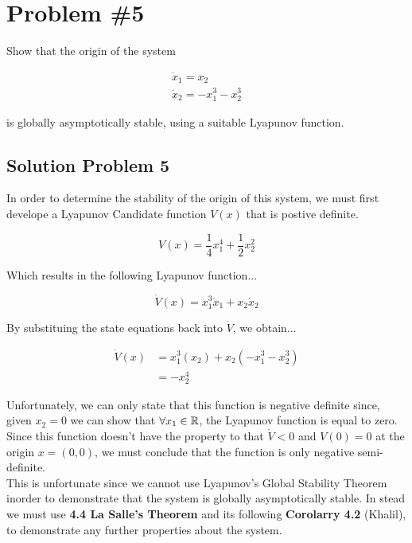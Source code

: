 \section*{Problem \#5}

Show that the origin of the system

$$
\begin{array}{l}
\dot{x}_{1}=x_{2} \\
\dot{x}_{2}=-x_{1}^{3}-x_{2}^{3}
\end{array}
$$

\noindent is globally asymptotically stable, using a suitable Lyapunov function.


\subsection*{Solution Problem 5}

In order to determine the stability of the origin of this system, we must first develope a Lyapunov Candidate function $V(x)$ that is postive definite.

$$
V(x) = \frac{1}{4}x_1^4 + \frac{1}{2}x_2^2
$$

\noindent Which results in the following Lyapunov function...

$$
\dot{V}(x) = x_1^3\dot{x}_1 + x_2\dot{x}_2
$$

\noindent By substituing the state equations back into $\dot{V}$, we obtain...

$$
\begin{aligned}
  \dot{V}(x) & = x_1^3(x_2) + x_2 (-x_1^3 -x_2^3) \\
        & = -x_2^4
\end{aligned}
$$

\noindent Unfortunately, we can only state that this function is negative definite since, given $x_2 =0$ we can show that $\forall x_1 \in \mathbb{R}$, the Lyapunov function is equal to zero. Since this function doesn't have the property to that $\dot{V}< 0$ and $V(0)=0$ at the origin $x = (0,0)$, we must conclude that the function is only negative semi-definite. \\

\noindent This is unfortunate since we cannot use Lyapunov's Global Stability Theorem inorder to demonstrate that the system is globally asymptotically stable. In stead we must use \textbf{4.4 La Salle's Theorem} and its following \textbf{Corolarry 4.2} (Khalil), to demonstrate any further properties about the system. \\


